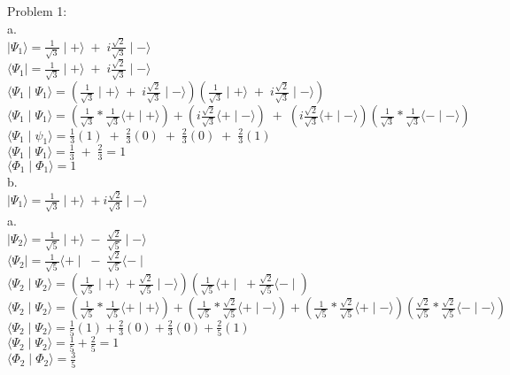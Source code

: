 \documentclass{article}
\begin{document}
Problem 1:\\
a.\\
$\mid\Psi_1\rangle=\frac{1}{\sqrt{3}}\mid+\rangle \;+ \; i\frac{\sqrt{2}}{\sqrt{3}}\mid-\rangle$\\
$\langle\Psi_1\mid=\frac{1}{\sqrt{3}}\mid+\rangle \;+ \; i\frac{\sqrt{2}}{\sqrt{3}}\mid-\rangle$\\
$\langle\Psi_1\mid\Psi_1\rangle=(\frac{1}{\sqrt{3}}\mid+\rangle \;+ \; i\frac{\sqrt{2}}{\sqrt{3}}\mid-\rangle)(\frac{1}{\sqrt{3}}\mid+\rangle \;+ \; i\frac{\sqrt{2}}{\sqrt{3}}\mid-\rangle)$\\
$\langle\Psi_1\mid\Psi_1\rangle=(\frac{1}{\sqrt{3}}*\frac{1}{\sqrt{3}}\langle+\mid+\rangle)+(i\frac{\sqrt{2}}{\sqrt{3}}\langle+\mid-\rangle)\;+\;(i\frac{\sqrt{2}}{\sqrt{3}}\langle+\mid-\rangle)(\frac{1}{\sqrt{3}}*\frac{1}{\sqrt{3}}\langle-\mid-\rangle)$\\
$\langle\Psi_1\mid\psi_1\rangle=\frac{1}{3}(1)\;+\;\frac{2}{3}(0)\;+\;\frac{2}{3}(0)\;+\;\frac{2}{3}(1)$\\
$\langle\Psi_1\mid\Psi_1\rangle=\frac{1}{3}\;+\;\frac{2}{3}=1$\\
$\langle\Phi_1\mid\Phi_1\rangle=1$\\

b.\\
$\mid\Psi_1\rangle=\frac{1}{\sqrt{3}}\mid+\rangle \;+ i\frac{\sqrt{2}}{\sqrt{3}}\mid-\rangle$\\



a.\\
$\mid\Psi_2\rangle=\frac{1}{\sqrt{5}}\mid+\rangle \;-\; \frac{\sqrt{2}}{\sqrt{5}}\mid-\rangle$\\
$\langle\Psi_2\mid=\frac{1}{\sqrt{5}}\langle+\mid \;-\; \frac{\sqrt{2}}{\sqrt{5}}\langle-\mid$\\
$\langle\Psi_2\mid\Psi_2\rangle=(\frac{1}{\sqrt{5}}\mid+\rangle \;+ \frac{\sqrt{2}}{\sqrt{5}}\mid-\rangle)(\frac{1}{\sqrt{5}}\langle+\mid \;+ \frac{\sqrt{2}}{\sqrt{5}}\langle-\mid)$\\
$\langle\Psi_2\mid\Psi_2\rangle=(\frac{1}{\sqrt{5}}*\frac{1}{\sqrt{5}}\langle+\mid+\rangle)+(\frac{1}{\sqrt{5}}*\frac{\sqrt{2}}{\sqrt{5}}\langle+\mid-\rangle)+(\frac{1}{\sqrt{5}}*\frac{\sqrt{2}}{\sqrt{5}}\langle+\mid-\rangle)(\frac{\sqrt{2}}{\sqrt{5}}*\frac{\sqrt{2}}{\sqrt{5}}\langle-\mid-\rangle)$\\
$\langle\Psi_2\mid\Psi_2\rangle=\frac{1}{5}(1)+\frac{2}{3}(0)+\frac{2}{3}(0)+\frac{2}{5}(1)$\\
$\langle\Psi_2\mid\Psi_2\rangle=\frac{1}{5}+\frac{2}{5}=1$\\
$\langle\Phi_2\mid\Phi_2\rangle=\frac{3}{5}$\\
\end{document}
